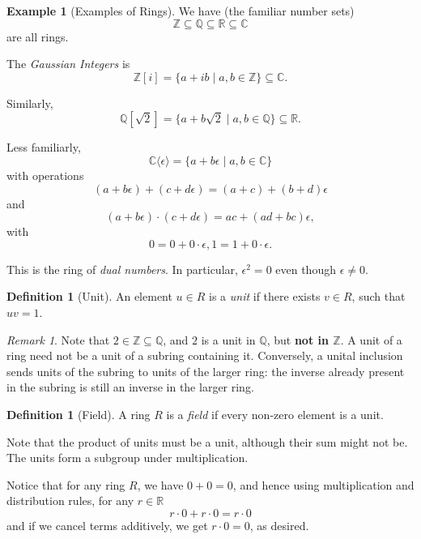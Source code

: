 \documentclass{article}
\theoremstyle{definition}
\newtheorem{definition}[theorem]{Definition}
\newtheorem{example}[theorem]{Example}
\theoremstyle{remark}
\newtheorem{remark}[theorem]{Remark}
\newcommand{\pqty}[1]{\left(#1\right)}
\newcommand{\bqty}[1]{\left[#1\right]}
\newcommand{\angBrac}[1]{\langle #1\rangle}
\newcommand{\set}[2]{\{#1\mid #2\}}
\newcommand{\subring}{\subseteq}
\newcommand{\ZZ}{\mathbb{Z}}
\newcommand{\QQ}{\mathbb{Q}}
\newcommand{\RR}{\mathbb{R}}
\newcommand{\CC}{\mathbb{C}}
\begin{document}
\begin{example}[Examples of Rings]
    \label{ex:rings}%
    We have (the familiar number sets)
    \[
        \ZZ \subring \QQ \subring \RR \subring \CC
    \]
    are all rings.

    The \emph{Gaussian Integers} is
    \[
        \ZZ \bqty{i} = \set{a + ib}{a, b \in \ZZ} \subring \CC.
    \]

    Similarly,
    \[
        \QQ \bqty{\sqrt{2}} = \set{a + b \sqrt{2}}{a, b \in \QQ} \subring \RR.
    \]

    Less familiarly,
    \[
        \CC \angBrac{\epsilon} = \set{a + b\epsilon}{a, b \in \CC}
    \]
    with operations
    \[
        \pqty{a + b\epsilon} + \pqty{c + d\epsilon} = \pqty{a + c} + \pqty{b + d}\epsilon
    \]
    and
    \[
        \pqty{a + b\epsilon} \cdot \pqty{c + d\epsilon} = ac + \pqty{ad + bc} \epsilon,
    \]
    with
    \[
        0 = 0 + 0 \cdot \epsilon, 1 = 1 + 0 \cdot \epsilon.
    \]

    This is the ring of \emph{dual numbers}. In particular, \(\epsilon^2 = 0\) even though \(\epsilon \neq 0\).
\end{example}

\begin{definition}[Unit]
    \label{def:unit}%
    An element \(u \in R\) is a \emph{unit} if there exists \(v \in R\), such that \(uv = 1\).
\end{definition}

\begin{remark}
    Note that \(2 \in \ZZ \subring \QQ\), and \(2\) is a unit in \(\QQ\), but \textbf{not in \(\ZZ\)}. A unit of a ring need not be a unit of a subring containing it. Conversely, a unital inclusion sends units of the subring to units of the larger ring: the inverse already present in the subring is still an inverse in the larger ring.
\end{remark}

\begin{definition}[Field]
    \label{def:field}%
    A ring \(R\) is a \emph{field} if every non-zero element is a unit.
\end{definition}

Note that the product of units must be a unit, although their sum might not be. The units form a subgroup under multiplication.

Notice that for any ring \(R\), we have \(0 + 0 = 0\), and hence using multiplication and distribution rules, for any \(r \in \RR\)
\[
    r \cdot 0 + r \cdot 0 = r \cdot 0
\]
and if we cancel terms additively, we get \(r \cdot 0 = 0\), as desired.
\end{document}
